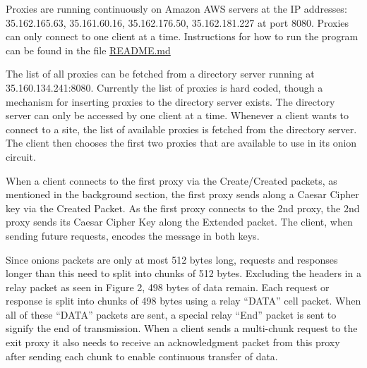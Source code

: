 \documentclass{article}
\begin{document}
\vspace{0.3 cm}

Proxies are running continuously on Amazon AWS servers at the IP addresses: 35.162.165.63, 35.161.60.16, 35.162.176.50, 35.162.181.227 at port 8080. Proxies can only connect to one client at a time. Instructions for how to run the program can be found in the file \href{https://github.com/asaha2/onion-routing/blob/master/README.md}{README.md}\\

\vspace{0.3 cm}

\noindent The list of all proxies can be fetched from a directory server running at  35.160.134.241:8080. Currently the list of proxies is hard coded, though a mechanism for inserting proxies to the directory server exists. The directory server can only be accessed by one client at a time. Whenever a client wants to connect to a site, the list of available proxies is fetched from the directory server. The client then chooses the first two proxies that are available to use in its onion circuit. \\

\vspace{0.3 cm}

\noindent When a client connects to the first proxy via the Create/Created packets, as mentioned in the background section, the first proxy sends along a Caesar Cipher key via the Created Packet. As the first proxy connects to the 2nd proxy, the 2nd proxy sends its Caesar Cipher Key along the Extended packet. The client, when sending future requests, encodes the message in both keys. \\

\vspace{0.3 cm}

\noindent Since onions packets are only at most 512 bytes long, requests and responses longer than this need to split into chunks of 512 bytes. Excluding the headers in a relay packet as seen in Figure 2, 498 bytes of data remain. Each request or response is split into chunks of 498 bytes using a relay ``DATA'' cell packet. When all of these ``DATA'' packets are sent, a special relay ``End'' packet is sent to signify the end of transmission.  When a client sends a multi-chunk request to the exit proxy it also needs to receive an acknowledgment packet from this proxy after sending each chunk to enable continuous transfer of data.\\

\vspace{0.3 cm}
\end{document}

